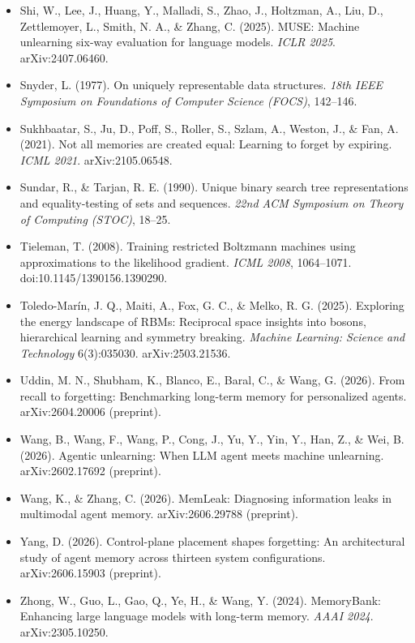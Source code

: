 \documentclass{article}
\begin{document}
\begin{itemize}
\item Shi, W., Lee, J., Huang, Y., Malladi, S., Zhao, J., Holtzman, A., Liu, D., Zettlemoyer, L., Smith, N. A., \& Zhang, C. (2025). MUSE: Machine unlearning six-way evaluation for language models. \emph{ICLR 2025}. arXiv:2407.06460.
\item Snyder, L. (1977). On uniquely representable data structures. \emph{18th IEEE Symposium on Foundations of Computer Science (FOCS)}, 142--146.
\item Sukhbaatar, S., Ju, D., Poff, S., Roller, S., Szlam, A., Weston, J., \& Fan, A. (2021). Not all memories are created equal: Learning to forget by expiring. \emph{ICML 2021}. arXiv:2105.06548.
\item Sundar, R., \& Tarjan, R. E. (1990). Unique binary search tree representations and equality-testing of sets and sequences. \emph{22nd ACM Symposium on Theory of Computing (STOC)}, 18--25.
\item Tieleman, T. (2008). Training restricted Boltzmann machines using approximations to the likelihood gradient. \emph{ICML 2008}, 1064--1071. doi:10.1145/1390156.1390290.
\item Toledo-Mar\'in, J. Q., Maiti, A., Fox, G. C., \& Melko, R. G. (2025). Exploring the energy landscape of RBMs: Reciprocal space insights into bosons, hierarchical learning and symmetry breaking. \emph{Machine Learning: Science and Technology} 6(3):035030. arXiv:2503.21536.
\item Uddin, M. N., Shubham, K., Blanco, E., Baral, C., \& Wang, G. (2026). From recall to forgetting: Benchmarking long-term memory for personalized agents. arXiv:2604.20006 (preprint).
\item Wang, B., Wang, F., Wang, P., Cong, J., Yu, Y., Yin, Y., Han, Z., \& Wei, B. (2026). Agentic unlearning: When LLM agent meets machine unlearning. arXiv:2602.17692 (preprint).
\item Wang, K., \& Zhang, C. (2026). MemLeak: Diagnosing information leaks in multimodal agent memory. arXiv:2606.29788 (preprint).
\item Yang, D. (2026). Control-plane placement shapes forgetting: An architectural study of agent memory across thirteen system configurations. arXiv:2606.15903 (preprint).
\item Zhong, W., Guo, L., Gao, Q., Ye, H., \& Wang, Y. (2024). MemoryBank: Enhancing large language models with long-term memory. \emph{AAAI 2024}. arXiv:2305.10250.
\end{itemize}
\end{document}
